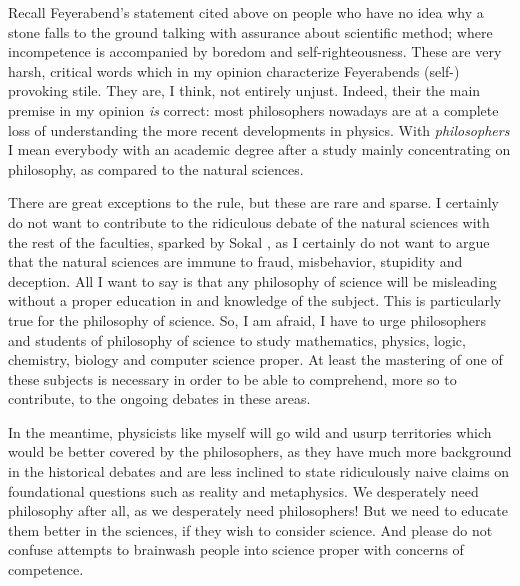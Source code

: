 \documentclass{article}
\begin{document}
Recall Feyerabend's statement cited above on people who have no idea why a stone falls to the ground
talking  with assurance about scientific method; where incompetence is accompanied by boredom
and self-righteousness.
These are very harsh,
critical words which in my opinion characterize Feyerabends (self-) provoking
stile.
They are, I think, not entirely unjust.
Indeed, their the main premise in my opinion {\em is} correct:
most philosophers nowadays are at a complete loss
of understanding the more recent developments in physics.
With {\em philosophers} I mean everybody with an academic degree after
a study mainly concentrating on philosophy, as compared to the natural sciences.

There are great exceptions to the rule, but these are rare and sparse.
I certainly do not want to contribute to the ridiculous debate of the natural sciences with the rest of the faculties,
sparked by Sokal \cite{sokal-aff},
as I certainly do not want to argue that the natural sciences are immune to fraud,
misbehavior, stupidity and deception.
All I want to say is that any philosophy of science will be misleading
without a proper education in and knowledge of the  subject.
This is particularly true for the philosophy of science.
So, I am afraid, I have to urge philosophers and students of philosophy of science
to study mathematics, physics, logic, chemistry, biology and computer science proper.
At least the mastering of one of these subjects is necessary
in order to be able to comprehend, more so to contribute, to the ongoing debates in these areas.


In the meantime, physicists like myself will go wild and usurp territories
which would be better covered by
the philosophers, as they have much more background in the historical debates and are less inclined
to state ridiculously naive claims on foundational questions such as reality and metaphysics.
We desperately need philosophy after all, as we desperately need philosophers!
But we need to educate them better in the sciences, if they wish to consider science.
And please do not confuse attempts to brainwash people into science proper with concerns of competence.
\end{document}
